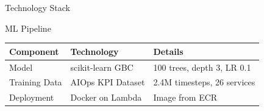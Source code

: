 \documentclass[aspectratio=169,11pt]{beamer}
\begin{document}
{\begin{frame}[t]{Technology Stack}
\vspace{0em}

\begin{block}{ML Pipeline}
\vspace{-0.2em}
\centering
\begin{tabular}{lll}
\toprule
\textbf{Component} & \textbf{Technology} & \textbf{Details} \\
\midrule
Model & scikit-learn GBC & 100 trees, depth 3, LR 0.1 \\
Training Data & AIOps KPI Dataset & 2.4M timesteps, 26 services \\
Deployment & Docker on Lambda & Image from ECR \\
\bottomrule
\end{tabular}
\vspace{-0.2em}
\end{block}

\end{frame}
}
\end{document}
